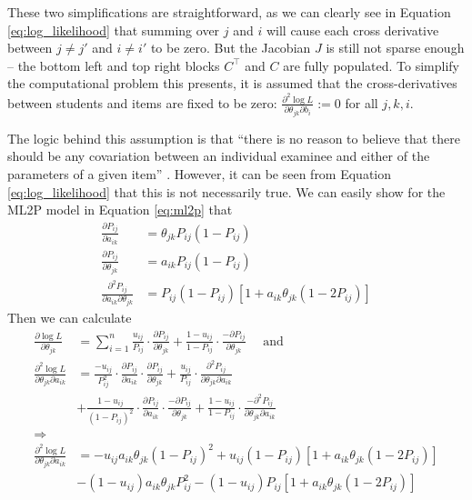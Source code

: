 These two simplifications are straightforward, as we can clearly see in Equation \ref{eq:log_likelihood} that summing over $j$ and $i$ will cause each cross derivative between $j \not = j'$ and $i \not = i'$ to be zero. But the Jacobian $J$ is still not sparse enough -- the bottom left and top right blocks $C^\top$ and $C$ are fully populated. To simplify the computational problem this presents, it is assumed that the cross-derivatives between students and items are fixed to be zero: $\displaystyle\frac{\partial^2 \log L}{\partial\theta_{jk} \partial b_{i}} := 0$ for all $j,k,i$. 

The logic behind this assumption is that ``there is no reason to believe that there should be any covariation between an individual examinee and either of the parameters of a given item'' \cite{baker_kim2004}. However, it can be seen from Equation \ref{eq:log_likelihood} that this is not necessarily true. We can easily show for the ML2P model in Equation \ref{eq:ml2p} that 
\begin{equation}
\begin{split}
  \frac{\partial P_{ij}}{\partial a_{ik}} &= \theta_{jk}P_{ij}(1-P_{ij}) \\
  \frac{\partial P_{ij}}{\partial \theta_{jk}} &= a_{ik}P_{ij}(1-P_{ij}) \\
  \frac{\partial^2 P_{ij}}{\partial a_{ik}\partial \theta_{jk}} &= P_{ij}(1-P_{ij})\left[ 1 + a_{ik} \theta_{jk} (1-2P_{ij}) \right]
\end{split}
\label{eq:ml2p_deriv}
\end{equation}
Then we can calculate
\begin{equation}
\begin{split}
  \frac{\partial \log L}{\partial \theta_{jk}} &= \sum_{i=1}^n  \frac{u_{ij}}{P_{ij}} \cdot \frac{\partial P_{ij}}{\partial \theta_{jk}} + \frac{1-u_{ij}}{1-P_{ij}} \cdot \frac{-\partial P_{ij}}{\partial \theta_{jk}} \quad \text{ and} \\
  \frac{\partial^2 \log L}{\partial \theta_{jk} \partial a_{ik}} &= \frac{-u_{ij}}{P_{ij}^2} \cdot \frac{\partial P_{ij}}{\partial a_{ik}} \cdot \frac{\partial P_{ij}}{\partial \theta_{jk}} + \frac{u_{ij}}{P_{ij}} \cdot \frac{\partial^2 P_{ij}}{\partial \theta_{jk}\partial a_{ik}} \\
  &+ \frac{1-u_{ij}}{(1-P_{ij})^2} \cdot \frac{\partial P_{ij}}{\partial a_{ik}} \cdot \frac{-\partial P_{ij}}{\partial \theta_{jk}} + \frac{1-u_{ij}}{1-P_{ij}} \cdot \frac{-\partial^2 P_{ij}}{\partial \theta_{jk} \partial a_{ik}} \\
  \Longrightarrow& \\
  \frac{\partial^2 \log L}{\partial \theta_{jk} \partial a_{ik}} &= -u_{ij}a_{ik}\theta_{jk}(1-P_{ij})^2 + u_{ij}(1-P_{ij})\left[1 + a_{ik}\theta_{jk}(1-2P_{ij})\right] \\
  &- (1-u_{ij})a_{ik}\theta_{jk}P_{ij}^2 - (1-u_{ij})P_{ij}\left[1 + a_{ik}\theta_{jk}(1-2P_{ij})\right]
\end{split}
  \label{eq:partial_deriv_nonzero}
\end{equation}
